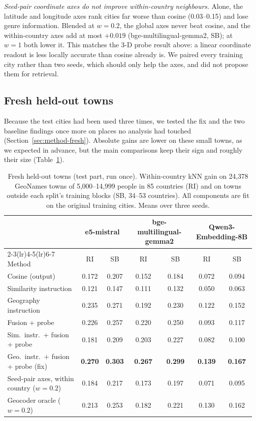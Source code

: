 \emph{Seed-pair coordinate axes do not improve within-country neighbours.} Alone, the latitude and longitude axes rank cities far worse than cosine (0.03--0.15) and lose genre information. Blended at $w=0.2$, the global axes never beat cosine, and the within-country axes add at most $+0.019$ (bge-multilingual-gemma2, SB); at $w=1$ both lower it. This matches the 3-D probe result above: a linear coordinate readout is less locally accurate than cosine already is. We paired every training city rather than two seeds, which should only help the axes, and \citet{feuerstein2026recovering} did not propose them for retrieval.

\subsection{Fresh held-out towns}
\label{sec:res-fresh}

Because the test cities had been used three times, we tested the fix and the two baseline findings once more on places no analysis had touched (Section~\ref{sec:method-fresh}). Absolute gains are lower on these small towns, as we expected in advance, but the main comparisons keep their sign and roughly their size (Table~\ref{tab:fresh}).

\begin{table}[t]
\centering
\footnotesize
\setlength{\tabcolsep}{3.5pt}
\caption{Fresh held-out towns (test part, run once). Within-country kNN gain on 24,378 GeoNames towns of 5,000--14,999 people in 85 countries (RI) and on towns outside each split's training blocks (SB, 34--53 countries). All components are fit on the original training cities. Means over three seeds.}
\label{tab:fresh}
\begin{tabular}{@{}lcccccc@{}}
\toprule
& \multicolumn{2}{c}{e5-mistral} & \multicolumn{2}{c}{bge-multilingual-gemma2} & \multicolumn{2}{c}{Qwen3-Embedding-8B} \\
\cmidrule(lr){2-3}\cmidrule(lr){4-5}\cmidrule(lr){6-7}
Method & RI & SB & RI & SB & RI & SB \\
\midrule
Cosine (output) & 0.172 & 0.207 & 0.152 & 0.184 & 0.072 & 0.094 \\
Similarity instruction & 0.121 & 0.147 & 0.111 & 0.132 & 0.050 & 0.063 \\
Geography instruction & 0.235 & 0.271 & 0.192 & 0.230 & 0.122 & 0.152 \\
Fusion + probe & 0.226 & 0.257 & 0.220 & 0.250 & 0.093 & 0.117 \\
Sim.\ instr.\ + fusion + probe & 0.181 & 0.209 & 0.203 & 0.227 & 0.082 & 0.100 \\
Geo.\ instr.\ + fusion + probe (fix) & \textbf{0.270} & \textbf{0.303} & \textbf{0.267} & \textbf{0.299} & \textbf{0.139} & \textbf{0.167} \\
Seed-pair axes, within country ($w=0.2$) & 0.184 & 0.217 & 0.173 & 0.197 & 0.071 & 0.095 \\
\midrule
Geocoder oracle ($w=0.2$) & 0.213 & 0.253 & 0.182 & 0.221 & 0.130 & 0.162 \\
\bottomrule
\end{tabular}
\end{table}

